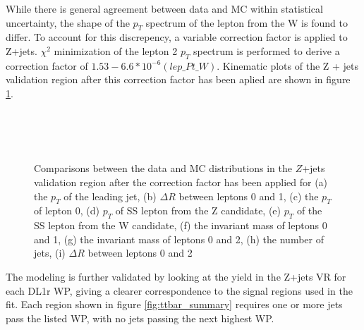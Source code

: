 While there is general agreement between data and MC within statistical uncertainty, the shape of the $p_T$ spectrum of the lepton from the W is found to differ. To account for this discrepency, a variable correction factor is applied to Z+jets. $\chi^2$ minimization of the lepton 2 $p_T$ spectrum is performed to derive a correction factor of $1.53 - 6.6*10^{-6} (lep\_Pt\_W)$. Kinematic plots of the Z + jets validation region after this correction factor has been aplied are shown in figure \ref{fig:zjets_withScale}.

\begin{figure}[hbt!]
    \\
    \\                                 
    \\
    \caption{Comparisons between the data and MC distributions in the $Z$+jets validation region after the correction factor has been applied for (a) the $p_T$ of the leading jet, (b) $\Delta R$ between leptons 0 and 1, (c) the $p_T$ of lepton 0, (d) $p_T$ of SS lepton from the Z candidate, (e) $p_T$ of the SS lepton from the W candidate, (f) the invariant mass of leptons 0 and 1, (g) the invariant mass of leptons 0 and 2, (h) the number of jets, (i) $\Delta R$ between leptons 0 and 2}%
    \label{fig:zjets_withScale}
\end{figure}

The modeling is further validated by looking at the yield in the Z+jets VR for each DL1r WP, giving a clearer correspondence to the signal regions used in the fit. Each region shown in figure \ref{fig:ttbar_summary} requires one or more jets pass the listed WP, with no jets passing the next highest WP.                                                                    

